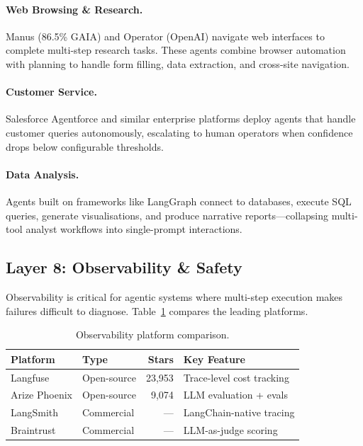 \documentclass[12pt, a4paper]{article}
\begin{document}
\paragraph{Web Browsing \& Research.} Manus (86.5\% GAIA) and Operator (OpenAI) navigate web interfaces to complete multi-step research tasks. These agents combine browser automation with planning to handle form filling, data extraction, and cross-site navigation.

\paragraph{Customer Service.} Salesforce Agentforce and similar enterprise platforms deploy agents that handle customer queries autonomously, escalating to human operators when confidence drops below configurable thresholds.

\paragraph{Data Analysis.} Agents built on frameworks like LangGraph connect to databases, execute SQL queries, generate visualisations, and produce narrative reports---collapsing multi-tool analyst workflows into single-prompt interactions.

\subsection{Layer 8: Observability \& Safety}
Observability is critical for agentic systems where multi-step execution makes failures difficult to diagnose. Table~\ref{tab:observability} compares the leading platforms.

\begin{table}[ht]
\centering
\caption{Observability platform comparison.}
\label{tab:observability}
\begin{tabular}{llrl}
\toprule
\textbf{Platform} & \textbf{Type} & \textbf{Stars} & \textbf{Key Feature} \\
\midrule
Langfuse       & Open-source & 23,953 & Trace-level cost tracking \\
Arize Phoenix  & Open-source & 9,074  & LLM evaluation + evals \\
LangSmith      & Commercial  & ---    & LangChain-native tracing \\
Braintrust     & Commercial  & ---    & LLM-as-judge scoring \\
\bottomrule
\end{tabular}
\end{table}
\end{document}
